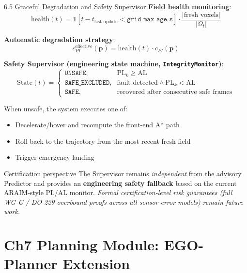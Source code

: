 \documentclass[10pt,aspectratio=169,xcolor=dvipsnames]{beamer}
\newcommand{\PL}{\mathrm{PL}}
\newcommand{\1}{\mathbb{1}}
\begin{document}
\begin{frame}{6.5 Graceful Degradation and Safety Supervisor}
  \small
  \textbf{Field health monitoring}:
  \[
    \mathrm{health}(t)=\1[t-t_{\text{last update}}<\texttt{grid\_max\_age\_s}]\cdot\frac{|\text{fresh voxels}|}{|\Omega_t|}
  \]

  \textbf{Automatic degradation strategy}:
  \[
    c_{PI}^{\text{effective}}(\bm{p})=\mathrm{health}(t)\cdot c_{PI}(\bm{p})
  \]

  \medskip
  \textbf{Safety Supervisor (engineering state machine, \texttt{IntegrityMonitor})}:
  \[
    \mathrm{State}(t)=
    \begin{cases}\texttt{UNSAFE}, & \PL_k\ge\mathrm{AL}\\\texttt{SAFE\_EXCLUDED}, & \text{fault detected}\wedge \PL_k<\mathrm{AL}\\\texttt{SAFE}, & \text{recovered after consecutive safe frames}
    \end{cases}
  \]

  When unsafe, the system executes one of:
  \begin{itemize}\scriptsize
    \item Decelerate/hover and recompute the front-end A* path
    \item Roll back to the trajectory from the most recent fresh field
    \item Trigger emergency landing
  \end{itemize}

  \begin{alertblock}{\small Certification perspective}
    \scriptsize The Supervisor remains \emph{independent} from the advisory Predictor and provides an \textbf{engineering safety fallback} based on the current ARAIM-style PL/AL monitor. \emph{Formal certification-level risk guarantees (full WG-C / DO-229 overbound proofs across all sensor error models) remain future work.}
  \end{alertblock}
\end{frame}

\section{Ch7 Planning Module: EGO-Planner Extension}
\end{document}
